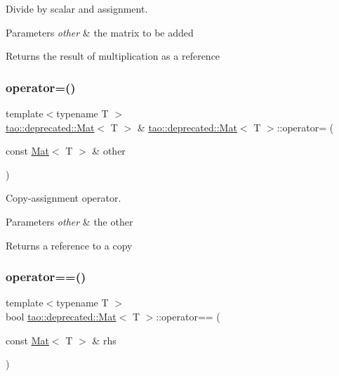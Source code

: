 Divide by scalar and assignment. 


\begin{DoxyParams}{Parameters}
{\em other} & the matrix to be added \\
\hline
\end{DoxyParams}
\begin{DoxyReturn}{Returns}
the result of multiplication as a reference 
\end{DoxyReturn}
\mbox{\label{classtao_1_1deprecated_1_1_mat_a67db37627eca2a32f98d4417a70847a1}} 
\subsubsection{\texorpdfstring{operator=()}{operator=()}}
{\footnotesize\ttfamily template$<$typename T $>$ \\
\mbox{\hyperlink{classtao_1_1deprecated_1_1_mat}{tao\+::deprecated\+::\+Mat}}$<$ T $>$ \& \mbox{\hyperlink{classtao_1_1deprecated_1_1_mat}{tao\+::deprecated\+::\+Mat}}$<$ T $>$\+::operator= (\begin{DoxyParamCaption}\item[{const \mbox{\hyperlink{classtao_1_1deprecated_1_1_mat}{Mat}}$<$ T $>$ \&}]{other }\end{DoxyParamCaption})}



Copy-\/assignment operator. 


\begin{DoxyParams}{Parameters}
{\em other} & the other \\
\hline
\end{DoxyParams}
\begin{DoxyReturn}{Returns}
a reference to a copy 
\end{DoxyReturn}
\mbox{\label{classtao_1_1deprecated_1_1_mat_a4257e6245d857e7557401dc36aab084f}} 
\subsubsection{\texorpdfstring{operator==()}{operator==()}}
{\footnotesize\ttfamily template$<$typename T $>$ \\
bool \mbox{\hyperlink{classtao_1_1deprecated_1_1_mat}{tao\+::deprecated\+::\+Mat}}$<$ T $>$\+::operator== (\begin{DoxyParamCaption}\item[{const \mbox{\hyperlink{classtao_1_1deprecated_1_1_mat}{Mat}}$<$ T $>$ \&}]{rhs }\end{DoxyParamCaption})}



